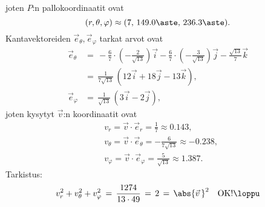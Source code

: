 joten $P$:n pallokoordinaatit ovat
\[
(r,\theta,\varphi) \approx (7,\,149.0\aste,\,236.3\aste).
\]
Kantavektoreiden $\vec e_\theta,\vec e_\varphi$ tarkat arvot ovat
\begin{align*}
\vec e_\theta  &=\,-\frac{6}{7}\cdot\left(-\frac{2}{\sqrt{13}}\right)\vec i
                  -\frac{6}{7}\cdot\left(-\frac{3}{\sqrt{13}}\right)\vec j
                  -\frac{\sqrt{13}}{7}\vec k \\
               &=\,\frac{1}{7\sqrt{13}}\,(12\vec i+18\vec j-13\vec k), \\
\vec e_\varphi &=\,\frac{1}{\sqrt{13}}\,(3\vec i-2\vec j),
\end{align*}
joten kysytyt $\vec v$:n koordinaatit ovat
\begin{align*}
&v_r       = \vec v\cdot\vec e_r       =  \frac{1}{7}          \approx  0.143, \\
&v_\theta  = \vec v\cdot\vec e_\theta  = -\frac{6}{7\sqrt{13}} \approx -0.238, \\
&v_\varphi = \vec v\cdot\vec e_\varphi =  \frac{5}{\sqrt{13}}  \approx  1.387.
\end{align*}
Tarkistus:
\[
v_r^2+v_\theta^2+v_\varphi^2\,=\,\frac{1274}{13 \cdot 49}\,
                              =\,2\,=\,\abs{\vec v\,}^2 \quad\text{OK!} \loppu
\]

